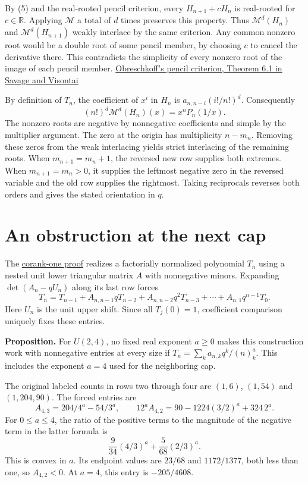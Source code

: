 \documentclass[11pt]{article}
\begin{document}
By (5) and the real-rooted pencil criterion, every $H_{n+1}+cH_n$ is real-rooted for $c\in\mathbb R$. Applying $\mathcal M$ a total of $d$ times preserves this property. Thus $\mathcal M^d(H_n)$ and $\mathcal M^d(H_{n+1})$ weakly interlace by the same criterion. Any common nonzero root would be a double root of some pencil member, by choosing $c$ to cancel the derivative there. This contradicts the simplicity of every nonzero root of the image of each pencil member. \href{https://dmtcs.episciences.org/articles/2321/download}{Obreschkoff's pencil criterion, Theorem 6.1 in Savage and Visontai}

By definition of $T_n$, the coefficient of $x^i$ in $H_n$ is $a_{n,n-i}(i!/n!)^d$. Consequently
\[
(n!)^d\mathcal M^d(H_n)(x)=x^nP_n(1/x).
\]
The nonzero roots are negative by nonnegative coefficients and simple by the multiplier argument. The zero at the origin has multiplicity $n-m_n$. Removing these zeros from the weak interlacing yields strict interlacing of the remaining roots. When $m_{n+1}=m_n+1$, the reversed new row supplies both extremes. When $m_{n+1}=m_n>0$, it supplies the leftmost negative zero in the reversed variable and the old row supplies the rightmost. Taking reciprocals reverses both orders and gives the stated orientation in $q$.


\section{An obstruction at the next cap}

The \href{https://github.com/ProgramComputer/open-math-research/blob/main/topics/balanced-arrays/no-full-row.md}{corank-one proof} realizes a factorially normalized polynomial $T_n$ using a nested unit lower triangular matrix $A$ with nonnegative minors. Expanding $\det(A_n-qU_n)$ along its last row forces
\[
T_n=T_{n-1}+A_{n,n-1}qT_{n-2}+A_{n,n-2}q^2 T_{n-3}+\cdots+A_{n,1}q^{n-1}T_0.
\]
Here $U_n$ is the unit upper shift. Since all $T_j(0)=1$, coefficient comparison uniquely fixes these entries.

\textbf{Proposition.} For $U(2,4)$, no fixed real exponent $a\ge0$ makes this construction work with nonnegative entries at every size if $T_n=\sum_k a_{n,k}q^k/(n)_k^a$. This includes the exponent $a=4$ used for the neighboring cap.

The original labeled counts in rows two through four are $(1,6)$, $(1,54)$ and $(1,204,90)$. The forced entries are
\[
A_{4,3}=204/4^a-54/3^a,\qquad
12^a A_{4,2}=90-1224(3/2)^a+324\,2^a .
\]
For $0\le a\le4$, the ratio of the positive terms to the magnitude of the negative term in the latter formula is
\[
\frac9{34}(4/3)^a+\frac5{68}(2/3)^a .
\]
This is convex in $a$. Its endpoint values are $23/68$ and $1172/1377$, both less than one, so $A_{4,2}<0$. At $a=4$, this entry is $-205/4608$.
\end{document}
